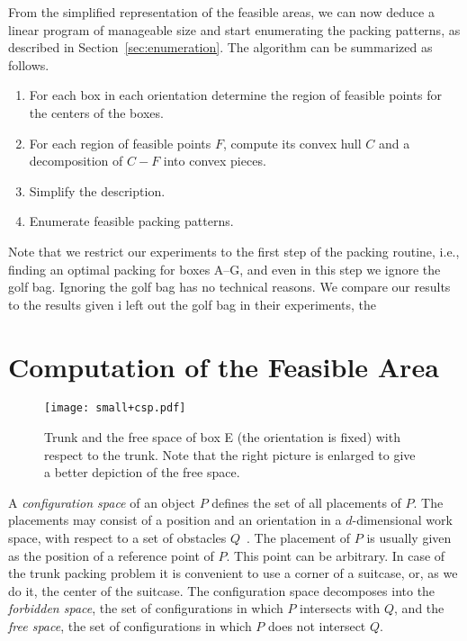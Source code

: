 \documentclass{article}
\newcounter{algo}
\begin{document}
From the simplified representation of the feasible areas, we can now
deduce a linear program of manageable size and start enumerating the
packing patterns, as described in Section~\ref{sec:enumeration}. The
algorithm can be summarized as follows.

\begin{enumerate}
\item For each box in each orientation determine the region of
feasible points for the centers of the boxes.
\item For each region of feasible points $F$, compute its convex hull
  $C$ and a decomposition of $C-F$ into convex pieces.
\item Simplify the description.
\item Enumerate feasible packing patterns.
\end{enumerate}

Note that we restrict our experiments to the first step of the packing
routine, i.e., finding an optimal packing for boxes A--G, and even in
this step we ignore the golf bag. Ignoring the golf bag has no
technical reasons. We compare our results to the results given i
left out the golf bag in their experiments, the


\section{Computation of the Feasible Area}
\label{sec:feasiblearea}

\begin{figure}[t]
\center \texttt{[image: small+csp.pdf]}
\caption{
\label{fig:csp}
Trunk and the free space of box E (the orientation is fixed) with
respect to the trunk. Note that the right picture is enlarged to give
a better depiction of the free space.}
\end{figure}

A \emph{configuration space} of an object $P$ defines the set of all
placements of $P$. The placements may consist of a position and an
orientation in a $d$-dimensional work space, with respect to a set of
obstacles $Q$~\cite{bkos-cgaa-97}. The placement of $P$ is usually
given as the position of a reference point of $P$. This point can be
arbitrary.  In case of the trunk packing problem it is convenient to
use a corner of a suitcase, or, as we do it, the center of the
suitcase. The configuration space decomposes into the \emph{forbidden
space}, the set of configurations in which $P$ intersects with $Q$,
and the \emph{free space}, the set of configurations in which $P$ does
not intersect $Q$.
\end{document}
